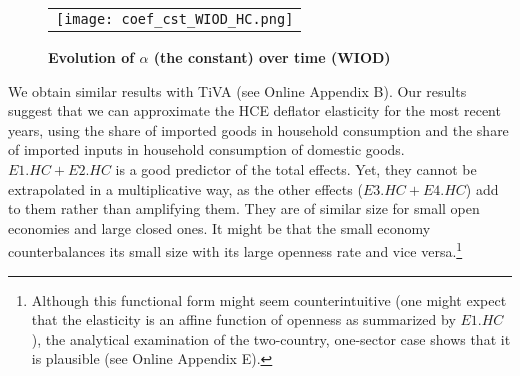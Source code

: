 \documentclass[12pt,a4paper]{paper}
\begin{document}
\begin{figure}[H]
\centering
\caption{\footnotesize{\textbf{Evolution of $\alpha$ (the constant) over time (WIOD)}}}
\begin{tabular}{c}
\texttt{[image: coef\_cst\_WIOD\_HC.png]}\\
\end{tabular}
\label{fig:evolution_cst}
\end{figure}


We obtain similar results with TiVA (see Online Appendix B). 
Our results suggest that we can approximate the HCE deflator elasticity for the most recent years, using the share of imported goods in household consumption and the share of imported inputs in household consumption of domestic goods. $E1.HC+E2.HC$ is a good predictor of the total effects.
Yet, they cannot be extrapolated in a multiplicative way, as the other effects ($E3.HC+E4.HC$) add to them rather than amplifying them.
They are of similar size for small open economies and large closed ones.
It might be that the small economy counterbalances its small size with its large openness rate and vice versa.\footnote{Although this functional form might seem counterintuitive (one might expect that the elasticity is an affine function of openness as summarized by $E1.HC$), the analytical examination of the two-country, one-sector case shows that it is plausible (see Online Appendix E).}
\end{document}
